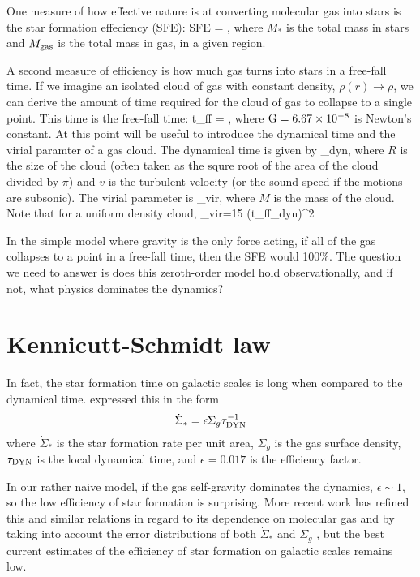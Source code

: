 \documentclass[../dissertation.tex]{subfiles}
\begin{document}
One measure of how effective nature is at converting molecular gas into stars is the star formation effeciency (SFE):
%
\be
{\rm SFE} = ,
\ee
%
where $M_*$ is the total mass in stars and $M_{\rm gas}$ is the total mass in gas, in a given region.

A second measure of efficiency is how much gas turns into stars in a free-fall time. If we imagine an isolated cloud of gas with constant density, $\rho(r) \rightarrow \rho$, we can derive the amount of time required for the cloud of gas to collapse to a single point.
This time is the free-fall time:
%
\be
t_{\rm ff} = ,
\ee
%
where $ {\rm G} = 6.67 \times 10^{-8} $ is Newton's constant. At this point will be useful to introduce the dynamical time and the virial paramter of a gas cloud. The dynamical time is given by
%
\be
\tau_{\rm dyn},
\ee
%
where $R$ is the size of the cloud (often taken as the squre root of the area of the cloud divided by $\pi$) and $v$ is the turbulent velocity (or the sound speed if the motions are subsonic). The virial parameter is
%
\be
\alpha_{\rm vir},
\ee
%
where $M$ is the mass of the cloud. Note that for a uniform density cloud,
%
\be
\alpha_{\rm vir}={15\pi} \left({t_{\rm ff}\over \tau_{\rm dyn}}\right)^2
\ee
%

In the simple model where gravity is the only force acting, if all of the gas collapses to a point in a free-fall time, then the SFE would 100\%.
The question we need to answer is does this zeroth-order model hold observationally, and if not, what physics dominates the dynamics?

\section{Kennicutt-Schmidt law}
In fact, the star formation time on galactic scales is long when compared to the dynamical time. 
\citet{1998ApJ...498..541K} expressed this in the form
%
\begin{equation}\label{eq:intro_KS_law}
\dot{\Sigma}_* = \epsilon\Sigma_g \tau_{\rm DYN}^{-1}
\end{equation}
%
where $\dot{\Sigma}_*$ is the star formation rate per unit area, $\Sigma_g$ is the 
gas surface density, $\tau_{\rm DYN}$ is the local dynamical time, and $\epsilon = 0.017$ 
is the efficiency factor.  

In our rather naive model, if the gas self-gravity dominates the dynamics, $\epsilon \sim 1$, so the low efficiency of star formation is surprising. 
More recent work has refined this and similar relations in regard to its dependence on molecular gas \citep{2008AJ....136.2846B} and by taking into account the error distributions of both $\dot\Sigma_*$ and $\Sigma_g$ \citep{2013MNRAS.430..288S}, but the best current estimates of the efficiency of star formation on galactic scales remains low. 
\end{document}
